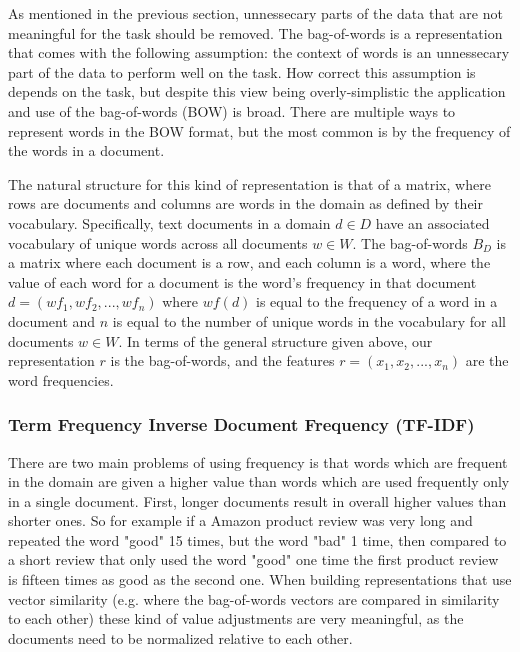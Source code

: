 As mentioned in the previous section, unnessecary parts of the data that are not  meaningful for the task should be removed. The bag-of-words is a representation that comes with the following assumption: the context of words is an unnessecary part of the data to perform well on the task. How correct this assumption is depends on the task, but despite this view being overly-simplistic the application and use of the bag-of-words (BOW) is broad. There are multiple ways to represent words in the BOW format, but the most common is by the frequency of the words in a document.

The natural structure for this kind of representation is that of a matrix, where rows are documents and columns are words in the domain as defined by their vocabulary. Specifically,  text documents in a domain $d \in D$ have an associated vocabulary of unique words across all documents $w \in W$. The bag-of-words $B_D$ is a matrix where each document is a row, and each column is a word, where the value of each word for a document is the word's frequency in that document $d = ({wf}_1, {wf}_2, ..., {wf}_n)$ where ${wf}(d)$ is equal to the frequency of a word in a document and $n$ is equal to the number of unique words  in the vocabulary for all documents $w \in W$. In terms of the general structure given above, our representation $r$  is the bag-of-words, and the features $r = (x_1, x_2, ..., x_n)$ are the word frequencies.


\subsubsection{Term Frequency Inverse Document Frequency (TF-IDF)}

There are two main problems of using frequency is that words which are frequent in the domain are given a higher value than words which are used frequently only in a single document. First, longer documents result in overall higher values than shorter ones. So for example if a Amazon product review was very long and repeated the word "good" 15 times, but the word "bad" 1 time, then compared to a short review that only used the word "good" one time the first product review is fifteen times as good as the second one. When building representations that use vector similarity (e.g. where the bag-of-words vectors are compared in similarity to each other) these kind of value adjustments are very meaningful, as the documents need to be normalized relative to each other.


